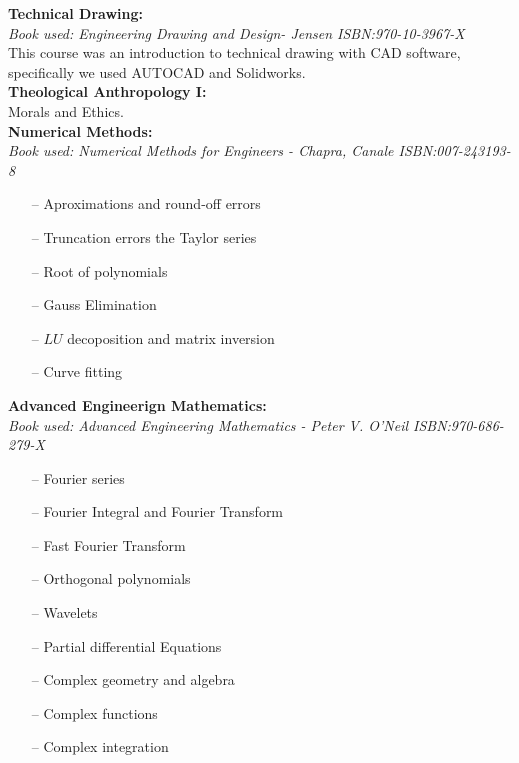 \documentclass{article}
\begin{document}
\textbf{Technical Drawing:}\\
    \emph{Book used: Engineering Drawing and Design- Jensen ISBN:970-10-3967-X}\\
    This course was an introduction to technical drawing with CAD software, specifically we
    used AUTOCAD and Solidworks.\\

\textbf{Theological Anthropology I:}\\
    Morals and Ethics.\\


\textbf{Numerical Methods:}\\
    \emph{Book used: Numerical Methods for Engineers - Chapra, Canale ISBN:007-243193-8}
    \begin{itemize}
     \setlength\itemsep{0pt}
    \item[--] Aproximations and round-off errors
    \item[--] Truncation errors the Taylor series
    \item[--] Root of polynomials
    \item[--] Gauss Elimination
    \item[--] $LU$ decoposition and matrix inversion
    \item[--] Curve fitting
    \end{itemize}

\textbf{Advanced Engineerign Mathematics:}\\
    \emph{Book used: Advanced Engineering Mathematics - Peter V. O'Neil  ISBN:970-686-279-X}
    \begin{itemize}
     \setlength\itemsep{0pt}
    \item[--] Fourier series
    \item[--] Fourier Integral and Fourier Transform
    \item[--] Fast Fourier Transform
    \item[--] Orthogonal polynomials 
    \item[--] Wavelets
    \item[--] Partial differential Equations
    \item[--] Complex geometry and algebra
    \item[--] Complex functions
    \item[--] Complex integration
    \end{itemize}
\end{document}
